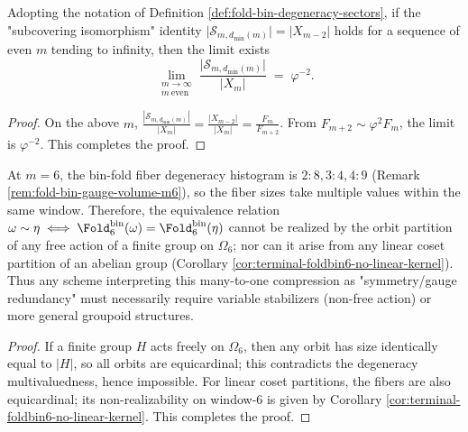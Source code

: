 \begin{corollary}\label{cor:fold-bin-minsector-density-phi-minus2}
Adopting the notation of Definition \ref{def:fold-bin-degeneracy-sectors},
if the "subcovering isomorphism" identity
\(
\bigl|\mathcal{S}_{m,d_{\min}(m)}\bigr|=|X_{m-2}|
\)
holds for a sequence of even \(m\) tending to infinity, then the limit exists
\[
\lim_{\substack{m\to\infty\\ m\ \mathrm{even}}}
\frac{\bigl|\mathcal{S}_{m,d_{\min}(m)}\bigr|}{|X_m|}
\;=\;
\varphi^{-2}.
\]
\end{corollary}
\begin{proof}
On the above \(m\),
\(
\frac{|\mathcal{S}_{m,d_{\min}(m)}|}{|X_m|}=\frac{|X_{m-2}|}{|X_m|}=\frac{F_m}{F_{m+2}}
\).
From \(F_{m+2}\sim \varphi^2 F_m\), the limit is \(\varphi^{-2}\). This completes the proof.
\end{proof}

\begin{corollary}\label{cor:foldbin6-degeneracy-multivalued-nonfree}
At \(m=6\), the bin-fold fiber degeneracy histogram is \(2:8,3:4,4:9\) (Remark \ref{rem:fold-bin-gauge-volume-m6}), so the fiber sizes take multiple values within the same window.
Therefore, the equivalence relation
\(
\omega\sim\eta\iff \Fold^{\mathrm{bin}}_6(\omega)=\Fold^{\mathrm{bin}}_6(\eta)
\)
cannot be realized by the orbit partition of any free action of a finite group on \(\Omega_6\); nor can it arise from any linear coset partition of an abelian group (Corollary \ref{cor:terminal-foldbin6-no-linear-kernel}).
Thus any scheme interpreting this many-to-one compression as "symmetry/gauge redundancy" must necessarily require variable stabilizers (non-free action) or more general groupoid structures.
\end{corollary}
\begin{proof}
If a finite group \(H\) acts freely on \(\Omega_6\), then any orbit has size identically equal to \(|H|\), so all orbits are equicardinal; this contradicts the degeneracy multivaluedness, hence impossible.
For linear coset partitions, the fibers are also equicardinal; its non-realizability on window-\(6\) is given by Corollary \ref{cor:terminal-foldbin6-no-linear-kernel}. This completes the proof.
\end{proof}

